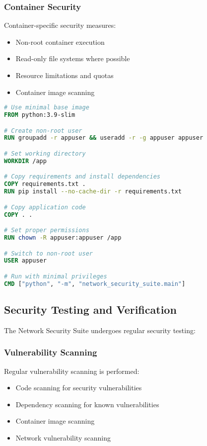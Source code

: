 \subsubsection{Container Security}
Container-specific security measures:

\begin{itemize}
    \item Non-root container execution
    \item Read-only file systems where possible
    \item Resource limitations and quotas
    \item Container image scanning
\end{itemize}

\begin{lstlisting}[language=dockerfile, caption=Secure Dockerfile Example]
# Use minimal base image
FROM python:3.9-slim

# Create non-root user
RUN groupadd -r appuser && useradd -r -g appuser appuser

# Set working directory
WORKDIR /app

# Copy requirements and install dependencies
COPY requirements.txt .
RUN pip install --no-cache-dir -r requirements.txt

# Copy application code
COPY . .

# Set proper permissions
RUN chown -R appuser:appuser /app

# Switch to non-root user
USER appuser

# Run with minimal privileges
CMD ["python", "-m", "network_security_suite.main"]
\end{lstlisting}

\subsection{Security Testing and Verification}
The Network Security Suite undergoes regular security testing:

\subsubsection{Vulnerability Scanning}
Regular vulnerability scanning is performed:

\begin{itemize}
    \item Code scanning for security vulnerabilities
    \item Dependency scanning for known vulnerabilities
    \item Container image scanning
    \item Network vulnerability scanning
\end{itemize}

